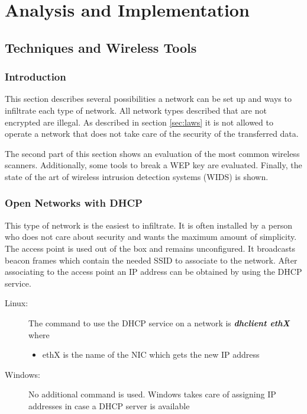 \part{Analysis and Implementation}

\chapter{Techniques and Wireless Tools}

\section{Introduction}

This section describes several possibilities a network can be set up and ways to infiltrate each type of network. All network types described that are not encrypted are illegal. As described in section \ref{sec:laws} it is not allowed to operate a network that does not take care of the security of the transferred data.

The second part of this section shows an evaluation of the most common wireless scanners. Additionally, some tools to break a WEP key are evaluated. Finally, the state of the art of wireless intrusion detection systems (WIDS) is shown.

\section{Open Networks with DHCP}

This type of network is the easiest to infiltrate. It is often installed by a person who does not care about security and wants the maximum amount of simplicity. The access point is used out of the box and remains unconfigured. It broadcasts beacon frames which contain the needed SSID to associate to the network. After associating to the access point an IP address can be obtained by using the DHCP service.

\begin{description}

\item [Linux:] The command to use the DHCP service on a network is
	{\em {\bf dhclient ethX}}
	where
	\begin{itemize}
		\item ethX is the name of the NIC which gets the new IP address
	\end{itemize}

\item [Windows:] No additional command is used. Windows takes care of assigning IP addresses in case a DHCP server is available

\end{description}

